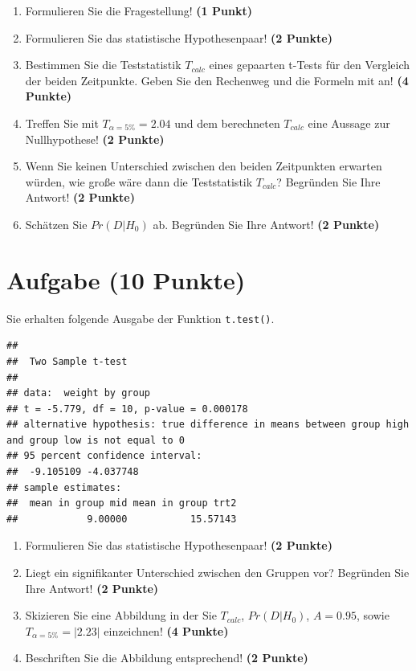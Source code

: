 \documentclass[a4paper, 10pt]{scrartcl}\usepackage[]{graphicx}\usepackage[]{xcolor}
\makeatletter
\newenvironment{kframe}{%
 \def\at@end@of@kframe{}%
 \ifinner\ifhmode%
  \def\at@end@of@kframe{\end{minipage}}%
  \begin{minipage}{\columnwidth}%
 \fi\fi%
 \def\FrameCommand##1{\hskip\@totalleftmargin \hskip-\fboxsep
 \colorbox{shadecolor}{##1}\hskip-\fboxsep
     \hskip-\linewidth \hskip-\@totalleftmargin \hskip\columnwidth}%
 \MakeFramed {\advance\hsize-\width
   \@totalleftmargin\z@ \linewidth\hsize
   \@setminipage}}%
 {\par\unskip\endMakeFramed%
 \at@end@of@kframe}
\newenvironment{knitrout}{}{} %
\makeatother
\begin{document}
\begin{enumerate}
\item Formulieren Sie die Fragestellung! \textbf{(1 Punkt)}
\item Formulieren Sie das statistische Hypothesenpaar! \textbf{(2
    Punkte)}
\item Bestimmen Sie die Teststatistik $T_{calc}$ eines gepaarten t-Tests f{\"u}r den
  Vergleich der beiden Zeitpunkte. Geben Sie den Rechenweg und die Formeln
  mit an! \textbf{(4 Punkte)}
\item Treffen Sie mit $T_{\alpha = 5\%} = 2.04$ und dem berechneten $T_{calc}$ eine Aussage
  zur Nullhypothese! \textbf{(2 Punkte)}
\item Wenn Sie keinen Unterschied zwischen den beiden Zeitpunkten erwarten
  w{\"u}rden, wie gro{\ss}e w{\"a}re dann die Teststatistik $T_{calc}$? Begr{\"u}nden Sie Ihre
  Antwort! \textbf{(2 Punkte)}
\item Sch{\"a}tzen Sie $Pr(D|H_0)$ ab. Begr{\"u}nden Sie Ihre Antwort! \textbf{(2
    Punkte)}
\end{enumerate} 
\clearpage

\section{Aufgabe \hfill (10 Punkte)}

Sie erhalten folgende \Rlogo Ausgabe der Funktion \texttt{t.test()}.

\begin{knitrout}
\color{fgcolor}\begin{kframe}
\begin{verbatim}
## 
## 	Two Sample t-test
## 
## data:  weight by group
## t = -5.779, df = 10, p-value = 0.000178
## alternative hypothesis: true difference in means between group high and group low is not equal to 0
## 95 percent confidence interval:
##  -9.105109 -4.037748
## sample estimates:
##  mean in group mid mean in group trt2 
##            9.00000           15.57143
\end{verbatim}
\end{kframe}
\end{knitrout}


\begin{enumerate}
  \item Formulieren Sie das statistische Hypothesenpaar! \textbf{(2
Punkte)}
\item Liegt ein signifikanter Unterschied zwischen den Gruppen vor?
  Begr{\"u}nden Sie Ihre Antwort! \textbf{(2 Punkte)}
\item Skizieren Sie eine Abbildung in der Sie $T_{calc}$, $Pr(D|H_0)$, $A=0.95$,
  sowie $T_{\alpha=5\%} = |2.23|$ einzeichnen! \textbf{(4 Punkte)}
\item Beschriften Sie die Abbildung entsprechend! \textbf{(2 Punkte)}  
\end{enumerate} 
\clearpage
\end{document}
